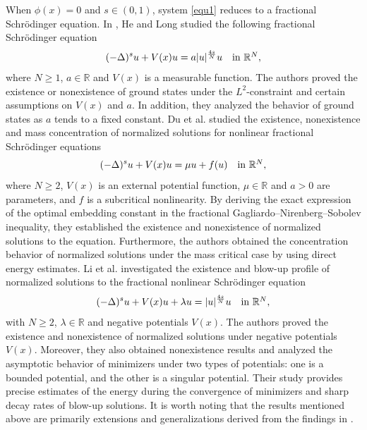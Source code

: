 \documentclass[reqno, 11pt]{amsart} %
\numberwithin{equation}{section}
\begin{document}
	When $\phi(x)=0$ and $s\in (0, 1)$, system \eqref{equ1} reduces to a fractional Schr\"{o}dinger equation. In \cite{H}, He and Long studied the following fractional Schr\"{o}dinger equation
	\begin{equation*}
		(-\Delta)^{s}u+V(x)u=a|u|^{\frac{4s}{N}}u\quad \hbox{in $\mathbb{R}^{N}$},
	\end{equation*}
	where $N\geq1$, $a\in\mathbb{R}$ and $V(x)$ is a measurable function. The authors proved the existence or nonexistence of ground states under the $L^{2}$-constraint and certain assumptions on $V(x)$ and $a$. In addition, they analyzed the  behavior of ground states as $a$ tends to a fixed constant. Du et al. \cite{D} studied the existence, nonexistence and mass concentration of normalized solutions for nonlinear fractional Schr\"{o}dinger equations
	\begin{equation*}
		(-\Delta)^{s}u+V(x)u=\mu u+f(u)\quad \hbox{in $\mathbb{R}^{N}$},
	\end{equation*}
	where $N\geq2$, $V(x)$ is an external potential function,  $\mu\in\mathbb{R}$ and $a>0$ are parameters, and $f$ is a subcritical nonlinearity. By deriving the exact expression of the optimal embedding constant in the fractional Gagliardo–Nirenberg–Sobolev inequality, they established the existence and nonexistence of normalized solutions to the equation. Furthermore, the authors obtained the concentration behavior of normalized solutions under the mass critical case by using direct energy estimates. Li et al. \cite{LLZ} investigated the existence and blow-up profile of normalized solutions to the fractional nonlinear Schr\"{o}dinger equation
	\begin{equation*}
		(-\Delta)^{s}u+V(x)u+\lambda u=|u|^{\frac{4s}{N}}u\quad \hbox{in $\mathbb{R}^{N}$},
	\end{equation*}
	with $N\geq2$, $\lambda\in \mathbb{R}$ and negative potentials $V(x)$. The authors proved the existence and nonexistence of normalized solutions under negative potentials $V(x)$. Moreover, they also obtained nonexistence results and analyzed the asymptotic behavior of minimizers under two types of potentials: one is a bounded potential, and the other is a singular potential. Their study provides precise estimates of the energy during the convergence of minimizers and sharp decay rates of blow-up solutions. It is worth noting that the results mentioned above are primarily extensions and generalizations derived from the findings in \cite{GLMP,GAH}.
	
\end{document}
